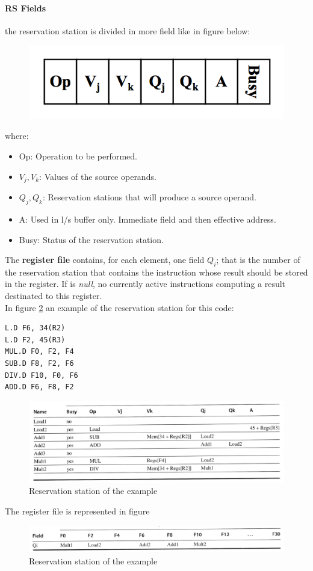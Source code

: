 \documentclass[12pt]{article}
\begin{document}
\paragraph{RS Fields} the reservation station is divided in more field like in figure below:
\begin{figure}[H]
  \centering
  \includegraphics[width=0.6\linewidth]{images/rsf.png}
  \label{fig:rsf}
\end{figure}
where:
\begin{itemize}
  \item Op: Operation to be performed.
  \item $V_j, V_k$: Values of the source operands.
  \item $Q_j, Q_k$: Reservation stations that will produce a source operand.
  \item A: Used in l/s buffer only. Immediate field and then effective address.
  \item Busy: Status of the reservation station.
\end{itemize}

The \textbf{register file} contains, for each element, one field $Q_i$; that is the number of the reservation station that contains the instruction whose result should be stored in the register. If is \textit{null}, no currently active instructions computing a result destinated to this register.\\

In figure \ref{fig:ers} an example of the reservation station for this code:
\begin{lstlisting}
L.D F6, 34(R2)
L.D F2, 45(R3)
MUL.D F0, F2, F4
SUB.D F8, F2, F6
DIV.D F10, F0, F6
ADD.D F6, F8, F2
\end{lstlisting}
\begin{figure}[H]
  \centering
  \includegraphics[width=\linewidth]{images/ers.png}
  \caption{Reservation station of the example}
  \label{fig:ers}
\end{figure}
The register file is represented in figure
\begin{figure}[H]
  \includegraphics[width=\linewidth]{images/erf.png}
  \caption{Reservation station of the example}
  \label{fig:erf}
\end{figure}
\end{document}
